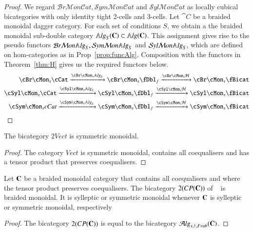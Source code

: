 \begin{proof}
We regard $\mathcal{B}r\mathcal{M}on\mathcal{C}at, 
\mathcal{S}ym\mathcal{M}on\mathcal{C}at$ and $ 
\mathcal{S}yl\mathcal{M}on\mathcal{C}at$ as locally cubical bicategories with only identity tight 2-cells and 3-cells. 
Let ${\cat C}$ be a braided monoidal dagger category. For each set of conditions $S$, we obtain a the braided monoidal sub-double category $\mathbb{A}\mathit{lg}_S({\bf C}) \subset \mathbb{A}\mathit{lg}({\bf C})$.  
This assignment gives rise to the pseudo functors $\mathcal{B}r\mathcal{M}on\mathbb{A}\mathit{lg}_S, 
\mathcal{S}ym\mathcal{M}on\mathbb{A}\mathit{lg}_S$ and $ 
\mathcal{S}yl\mathcal{M}on\mathbb{A}\mathit{lg}_S$, which are defined on hom-categories as in Prop~\ref{prop:funcAlg}. Composition with the functors in Theorem~\ref{thm:H} gives us the required functors below.
\begin{align*}
 \cBr\cMon_s\cCat\xrightarrow{\cBr\cMon_s \bAlg_S} \cBr\cMon_s\fDbl_f \xrightarrow{\cBr\cMon_s \cH} \cBr\cMon_s \fBicat \\
   \cSyl\cMon_s\cCat \xrightarrow{\cSyl\cMon_s\bAlg_S} \cSyl\cMon_s\fDbl_f \xrightarrow{\cSyl\cMon_s\cH} \cSyl\cMon_s\fBicat\\
  \cSym\cMon_scCat \xrightarrow{\cSym\cMon_s\bAlg_S} \cSym\cMon_s\fDbl_f \xrightarrow{\cSym\cMon_s \cH} \cSym\cMon_s \fBicat 
\end{align*}
\end{proof}

\begin{cor}
The bicategory $2Vect$ is symmetric monoidal.
\end{cor}

\begin{proof}
The category $Vect$ is symmetric monoidal, contains all coequalisers and has a tensor product that preserves coequalisers. 
\end{proof}

\begin{cor}
Let ${\bf C}$ be a braided monoidal category that contains all coequalisers and where the tensor product preserves coequalisers. The bicategory $2(CP({\bf C}))$ of ~\cite{heunenvicarywester} is braided monoidal. It is sylleptic or symmetric monoidal whenever ${\bf C}$ is sylleptic or symmetric monoidal, respectively
\end{cor}

\begin{proof}
The bicategory $2(CP({\bf C}))$ is equal to the bicategory $\mathcal{A}\mathit{lg}_{s,\dagger, Frob}({\bf C})$.
\end{proof}
